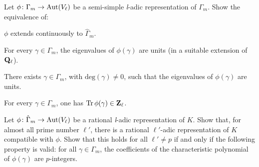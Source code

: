 \begin{exercises}
\begin{nlist}
\item Let $\phi\colon \Gamma_m\to\mathrm{Aut}(V_\ell)$ be a semi-simple
\textit{l}-adic representation of $\Gamma_m$.  Show the equivalence of:
\begin{alist}
\item $\phi$ extends continuously to $\hat{\Gamma}_m$.
\item For every $\gamma\in\Gamma_m$, the eigenvalues of $\phi(\gamma)$
are units (in a suitable extension of $\mathbf{Q}_\ell$).
\item There exists $\gamma\in\Gamma_m$, with $\mathrm{deg}(\gamma)\neq 0$,
such that the eigenvalues of $\phi(\gamma)$ are units.
\item For every $\gamma\in\Gamma_m$, one has
$\mathrm{Tr}\,\phi(\gamma)\in\mathbf{Z}_\ell$.
\end{alist}
\item Let $\phi\colon \hat{\Gamma}_m\to\mathrm{Aut}(V_\ell)$ be a rational
\textit{l}-adic representation of $K$.  Show that, for almost all prime
number $\ell'$, there is a rational $\ell'$-adic representation of $K$
compatible with $\phi$.  Show that this holds for all $\ell'\neq p$ if
and only if the following property is valid: for all
$\gamma\in\Gamma_m$, the coefficients of the characteristic polynomial of
$\phi(\gamma)$ are $p$-integers.
\end{nlist}
\end{exercises}
